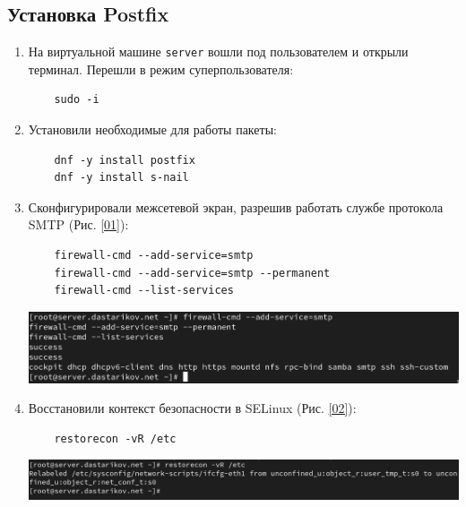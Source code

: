 \subsection{Установка Postfix}
\begin{enumerate}
\item На виртуальной машине \texttt{server} вошли под пользователем и открыли терминал. Перешли в режим суперпользователя:
  \begin{verbatim}
    sudo -i
  \end{verbatim}

\item Установили необходимые для работы пакеты:
  \begin{verbatim}
    dnf -y install postfix
    dnf -y install s-nail
  \end{verbatim}

\item Сконфигурировали межсетевой экран, разрешив работать службе протокола SMTP (Рис. \ref{01}):
  \begin{verbatim}
    firewall-cmd --add-service=smtp
    firewall-cmd --add-service=smtp --permanent
    firewall-cmd --list-services
  \end{verbatim}

\begin{center}
    \centering
    \includegraphics[width=\textwidth]{../images/image01.png}
    \label{01}
\end{center}

\item Восстановили контекст безопасности в SELinux (Рис. \ref{02}):
  \begin{verbatim}
    restorecon -vR /etc
  \end{verbatim}

\begin{center}
    \centering
    \includegraphics[width=\textwidth]{../images/image02.png}
    \label{02}
\end{center}


\end{enumerate}
